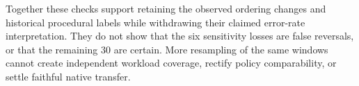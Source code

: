 Together these checks support retaining the observed ordering changes and
historical procedural labels while withdrawing their claimed error-rate
interpretation. They do not show that the six sensitivity losses are false
reversals, or that the remaining 30 are certain. More resampling of the
same windows cannot create independent workload coverage, rectify policy
comparability, or settle faithful native transfer.
